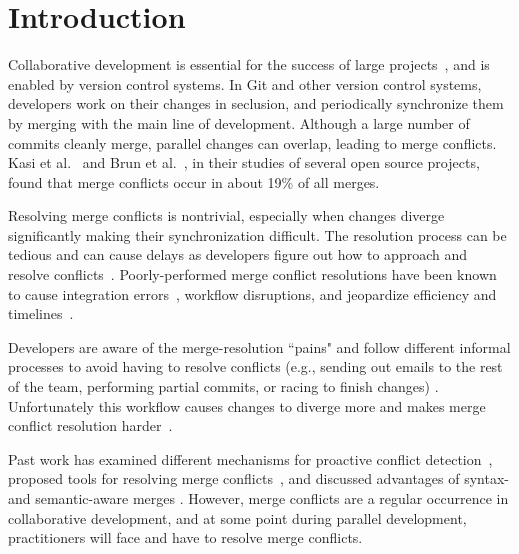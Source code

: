 

\section{Introduction}\label{introduction}

Collaborative development is essential for the success of large projects~\cite{hattori2010syde}, and is enabled by version control systems. 
In Git and other version control systems, developers work on their changes in seclusion, and periodically synchronize them by merging with the main line of development. 
Although a large number of commits cleanly merge, parallel changes can overlap, leading to merge conflicts. Kasi et al.~\cite{cassandra} and Brun et al.~\cite{Brun2011}, in their studies of several open source projects, found that merge conflicts occur in about 19\% of all merges.

Resolving merge conflicts is nontrivial, especially when changes diverge significantly making their synchronization difficult. 
The resolution process can be tedious and can cause delays as developers figure out how to approach and resolve conflicts~\cite{cassandra}. 
Poorly-performed merge conflict resolutions have been known to cause integration errors~\cite{bird-branches-conflict}, workflow disruptions, and jeopardize efficiency and timelines~\cite{estler2014awareness}. 

Developers are aware of the merge-resolution ``pains" and follow different informal processes to avoid having to resolve conflicts (e.g., sending out emails to the rest of the team, performing partial commits, or racing to finish changes) \cite{deSouza2003breaking}\cite{cataldo2008distributed_dev}.
Unfortunately this workflow causes changes to diverge more and makes merge conflict resolution harder~\cite{Brun2011}. 


Past work has examined different mechanisms for proactive conflict detection~\cite{Brun2011}\cite{palantir}\cite{Guimaraes}, proposed tools for resolving merge conflicts~\cite{nishimura}\cite{mens2002state}, and discussed advantages of syntax- and semantic-aware merges \cite{danny_refactorings}\cite{hunt2002extensible}. 
However, merge conflicts are a regular occurrence in collaborative development, and at some point during parallel development, practitioners will face and have to resolve merge conflicts.

